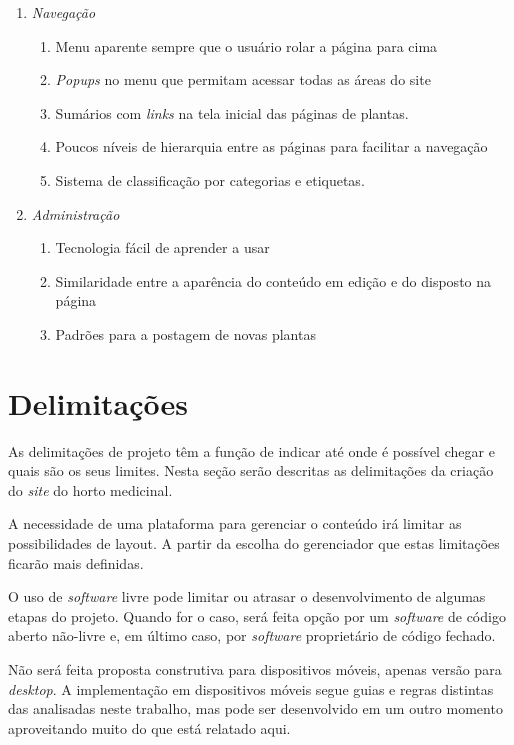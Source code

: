 \begin{enumerate}
\def\labelenumi{\arabic{enumi}.}
\tightlist
\item
  \emph{Navegação}

  \begin{enumerate}
  \def\labelenumii{\arabic{enumii}.}
  \tightlist
  \item
    Menu aparente sempre que o usuário rolar a página para cima
  \item
    \emph{Popups} no menu que permitam acessar todas as áreas do site
  \item
    Sumários com \emph{links} na tela inicial das páginas de plantas.
  \item
    Poucos níveis de hierarquia entre as páginas para facilitar a navegação
  \item
    Sistema de classificação por categorias e etiquetas.
  \end{enumerate}
\item
  \emph{Administração}

  \begin{enumerate}
  \def\labelenumii{\arabic{enumii}.}
  \tightlist
  \item
    Tecnologia fácil de aprender a usar
  \item
    Similaridade entre a aparência do conteúdo em edição e do disposto na página
  \item
    Padrões para a postagem de novas plantas
  \end{enumerate}
\end{enumerate}

\section{Delimitações}\label{delimitacoes}

As delimitações de projeto têm a função de indicar até onde é possível chegar e quais são os seus limites. Nesta seção serão descritas as delimitações da criação do \emph{site} do horto medicinal.

A necessidade de uma plataforma para gerenciar o conteúdo irá limitar as possibilidades de layout. A partir da escolha do gerenciador que estas limitações ficarão mais definidas.

O uso de \emph{software} livre pode limitar ou atrasar o desenvolvimento de algumas etapas do projeto. Quando for o caso, será feita opção por um \emph{software} de código aberto não-livre e, em último caso, por \emph{software} proprietário de código fechado.

Não será feita proposta construtiva para dispositivos móveis, apenas versão para \emph{desktop}. A implementação em dispositivos móveis segue guias e regras distintas das analisadas neste trabalho, mas pode ser desenvolvido em um outro momento aproveitando muito do que está relatado aqui.
